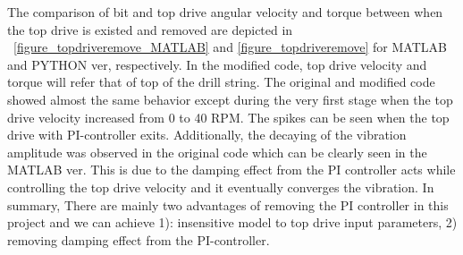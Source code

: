 The comparison of bit and top drive angular velocity and torque between when the top drive is existed and removed are depicted in \figurename~\ref{figure_topdriveremove_MATLAB} and \ref{figure_topdriveremove} for MATLAB and PYTHON ver, respectively. In the modified code, top drive velocity and torque will refer that of top of the drill string. The original and modified code showed almost the same behavior except during the very first stage when the top drive velocity increased from 0 to 40 RPM. The spikes can be seen when the top drive with PI-controller exits. Additionally, the decaying of the vibration amplitude was  observed in the original code which can be clearly seen in the MATLAB ver. This is due to the damping effect from the PI controller acts while controlling the top drive velocity and it eventually converges the vibration. In summary, There are mainly two advantages of removing the PI controller in this project and we can achieve 1): insensitive model to top drive input parameters, 2) removing damping effect from the PI-controller.
